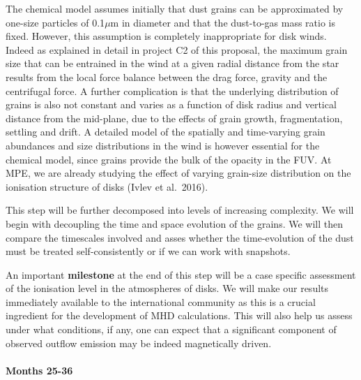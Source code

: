 \documentclass[10pt,fleqn,twoside]{article}
\begin{document}
 The chemical model assumes
initially that dust grains can be approximated by one-size particles
of 0.1${\mu}$m in diameter and that the dust-to-gas mass ratio is
fixed.  However, this assumption is completely inappropriate for disk
winds. Indeed as explained in detail in project C2 of this proposal,
the maximum grain size that can be entrained in the wind at a given
radial distance from the star results from the local force balance
between the drag force, gravity and the centrifugal force. A further
complication is that the underlying distribution of grains is also not
constant and varies as a function of disk radius and vertical distance
from the mid-plane, due to the effects of grain growth, fragmentation,
settling and drift. A detailed model of the spatially and time-varying
grain abundances and size distributions in the wind is however
essential for the chemical model, since grains provide the bulk of the
opacity in the FUV.   At MPE, we are
already studying the effect of varying grain-size distribution on the
ionisation structure of disks (Ivlev et al.\ 2016).  

This step will be further decomposed into levels of increasing
complexity. We will begin with decoupling the time and space evolution
of the grains. We will then compare the timescales involved and asses
whether the time-evolution of the dust must be treated
self-consistently or if we can work with snapshots.  

An important {\bf milestone} at the end of this step will be a case
specific assessment of the ionisation level in the atmospheres of
disks.   We will make our results immediately available to the international
community as this is a crucial ingredient for the development of MHD
calculations. This will also help us assess under what conditions, if
any, one can expect that a significant component of observed outflow
emission may be indeed magnetically driven.

\paragraph{ Months 25-36}
\end{document}
